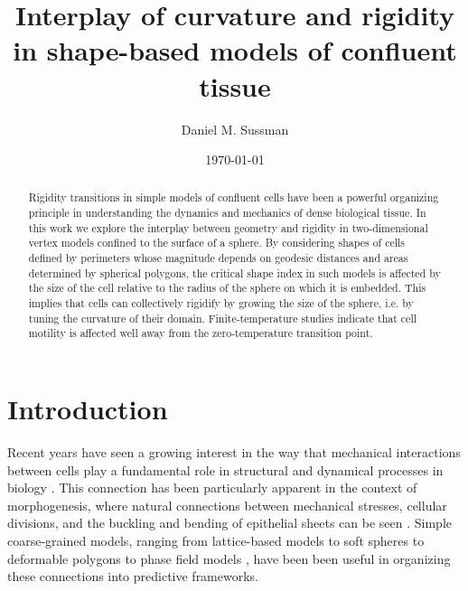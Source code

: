 \documentclass[aps,pre,reprint,superscriptaddress,nofootinbib]{revtex4-2}
\begin{document}
\frenchspacing

\title{Interplay of curvature and rigidity in shape-based models of confluent tissue}

\author{Daniel M. Sussman}


\date{\today}

\begin{abstract}
Rigidity transitions in simple models of confluent cells have been a powerful organizing principle in understanding the dynamics and mechanics of dense biological tissue. In this work we explore the interplay between geometry and rigidity in two-dimensional vertex models confined to the surface of a sphere. By considering shapes of cells defined by perimeters whose magnitude depends on geodesic distances and areas determined by spherical polygons, the critical shape index in such models is affected by the size of the cell relative to the radius of the sphere on which it is embedded. This implies that cells can collectively rigidify by growing the size of the sphere, i.e. by tuning the curvature of their domain. Finite-temperature studies indicate that cell motility is affected well away from the zero-temperature transition point.
\end{abstract}

\maketitle


\section{Introduction}

Recent years have seen a growing interest in the way that mechanical interactions between cells play a fundamental role in structural and dynamical processes in biology \cite{d1952growth,irvine2017mechanical}. This connection has been particularly apparent in the context of morphogenesis, where natural connections between mechanical stresses, cellular divisions, and the buckling and bending of epithelial sheets can be seen \cite{irvine2017mechanical,osterfield2013three, goodwin2019smooth,rupprecht2017geometric,streichan2018global,fouchard2020curling}. Simple coarse-grained models, ranging from lattice-based models to soft spheres to deformable polygons to phase field models \cite{Brodland2004, van2015simulating,teomy2018confluent,boromand2018jamming}, have been been useful in organizing these connections into predictive frameworks.
\end{document}
